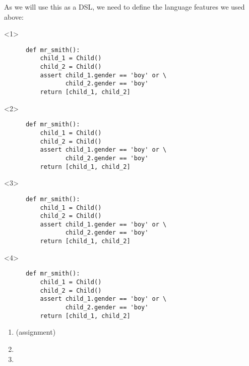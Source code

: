 \documentclass[usenames,dvipsnames]{beamer}
\begin{document}
\begin{frame}[fragile]
  As we will use this as a DSL, we need to define the language features we used
  above:
  \begin{onlyenv}<1>
    \begin{verbatim}
      def mr_smith():
          child_1 = Child()
          child_2 = Child()
          assert child_1.gender == 'boy' or \
                 child_2.gender == 'boy'
          return [child_1, child_2]
    \end{verbatim}
  \end{onlyenv}
  \begin{onlyenv}<2>
    \begin{verbatim}
      def mr_smith():
          child_1 = Child()
          child_2 = Child()
          assert child_1.gender == 'boy' or \
                 child_2.gender == 'boy'
          return [child_1, child_2]
    \end{verbatim}
  \end{onlyenv}
  \begin{onlyenv}<3>
    \begin{verbatim}
      def mr_smith():
          child_1 = Child()
          child_2 = Child()
          assert child_1.gender == 'boy' or \
                 child_2.gender == 'boy'
          return [child_1, child_2]
    \end{verbatim}
  \end{onlyenv}
  \begin{onlyenv}<4>
    \begin{verbatim}
      def mr_smith():
          child_1 = Child()
          child_2 = Child()
          assert child_1.gender == 'boy' or \
                 child_2.gender == 'boy'
          return [child_1, child_2]
    \end{verbatim}
  \end{onlyenv}
  \begin{enumerate}
    \item<2-> \text{\tt \char61{}} (assignment)
    \item<3-> 
    \item<4-> 
  \end{enumerate}
\end{frame}
\end{document}
